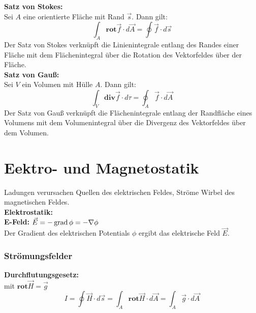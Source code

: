 \documentclass[german]{latex4ei/latex4ei_sheet}
\begin{document}
\begin{sectionbox}
\end{sectionbox}


\begin{sectionbox}
    \textbf{Satz von Stokes:}\\
    Sei $A$ eine orientierte Fläche mit Rand $\vec{s}$. Dann gilt:
    \begin{equation*}
        \int_{A} \mathbf{rot}\vec{f} \cdot d\vec{A} = \oint  \vec{f} \cdot d\vec{s}
    \end{equation*}
    Der Satz von Stokes verknüpft die Linienintegrale entlang des Randes einer Fläche mit dem Flächenintegral über die Rotation des Vektorfeldes über der Fläche.\\

    \textbf{Satz von Gauß:}\\
    Sei $V$ ein Volumen mit Hülle $A$. Dann gilt:
    \begin{equation*}
        \int_{V} \mathbf{div}\vec{f} \cdot d\tau = \oint_{A} \vec{f} \cdot d\vec{A}
    \end{equation*}
    Der Satz von Gauß verknüpft die Flächenintegrale entlang der Randfläche eines Volumens mit dem Volumenintegral über die Divergenz des Vektorfeldes über dem Volumen.\\
\end{sectionbox}

\section{Eektro- und Magnetostatik}
\begin{sectionbox}
    Ladungen verursachen Quellen des elektrischen Feldes,
    Ströme Wirbel des magnetischen Feldes. \\

    \textbf{Elektrostatik:}\\
    \textbf{E-Feld:} $\vec{E} = -\operatorname{grad} \phi = -\nabla \phi$\\
    Der Gradient des elektrischen Potentials $\phi$ ergibt das elektrische Feld $\vec{E}$.\\

    \subsubsection{Strömungsfelder}
    \textbf{Durchflutungsgesetz:}\\
    mit $\mathbf{rot}\vec{H} = \vec{g}$
    \begin{equation*}
        I = \oint \vec{H} \cdot d \vec{s} = \int_{A} \mathbf{rot}\vec{H} \cdot d \vec{A} =\int_{A} \vec{g} \cdot d \vec{A}
    \end{equation*}
\end{sectionbox}
\end{document}
